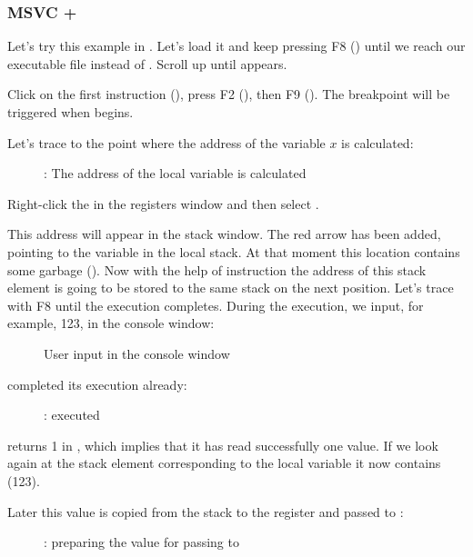 \clearpage
\subsubsection{MSVC + \olly}
\myindex{\olly}

Let's try this example in \olly.
Let's load it and keep pressing F8 (\stepover) until we reach our executable file instead of .
Scroll up until \main appears.

Click on the first instruction (), press F2 (), then F9 ().
The breakpoint will be triggered when \main begins.

Let's trace to the point where the address of the variable $x$ is calculated:

\begin{figure}[H]
\centering
{}
\caption{\olly: The address of the local variable is calculated}
\label{fig:scanf_ex1_olly_1}
\end{figure}

Right-click the \EAX in the registers window and then select .

This address will appear in the stack window.
The red arrow has been added, pointing to the variable in the local stack.
At that moment this location contains some garbage ().
Now with the help of \PUSH instruction the address of this stack element is going to be stored to the same stack on the next position.
Let's trace with F8 until the \scanf execution completes.
During the \scanf execution, we input, for example, 123, in the console window:

\begin{figure}[H]
\centering
{}
\caption{User input in the console window}
\label{fig:scanf_ex1_olly_2}
\end{figure}

\clearpage
\scanf completed its execution already:

\begin{figure}[H]
\centering
{}
\caption{\olly: \scanf executed}
\label{fig:scanf_ex1_olly_3}
\end{figure}

\scanf returns 1 in \EAX, which implies that it has read successfully one value.
If we look again at the stack element corresponding to the local variable it now contains  (123).

\clearpage

Later this value is copied from the stack to the \ECX register and passed to \printf:

\begin{figure}[H]
\centering
{}
\caption{\olly: preparing the value for passing to \printf}
\label{fig:scanf_ex1_olly_4}
\end{figure}
